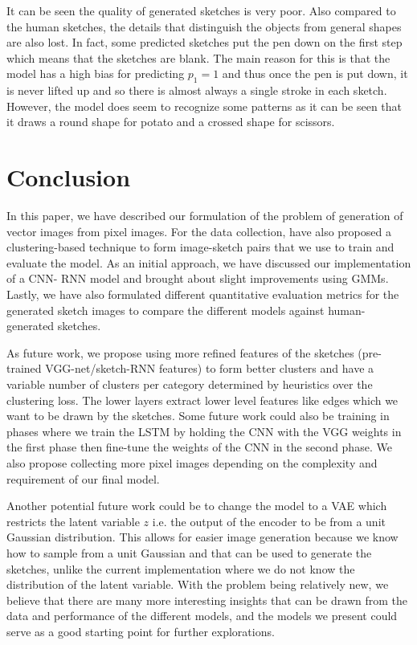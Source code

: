 \documentclass{article}
\begin{document}
It can be seen the quality of generated sketches is very poor. Also compared to the human sketches, the details that distinguish the objects from general shapes are also lost. In fact, some predicted sketches put the pen down on the first step which means that the sketches are blank. The main reason for this is that the model has a high bias for predicting $p_{1} = 1$ and thus once the pen is put down, it is never lifted up and so there is almost always a single stroke in each sketch. However, the model does seem to recognize some patterns as it can be seen that it draws a round shape for potato and a crossed shape for scissors.

\section{Conclusion}

In this paper, we have described our formulation of the problem of generation of vector images from pixel images. For the data collection, have also proposed a clustering-based technique to form image-sketch pairs that we use to train and evaluate the model. As an initial approach, we have discussed our implementation of a CNN- RNN model and brought about slight improvements using GMMs. Lastly, we have also formulated different quantitative evaluation metrics for the generated sketch images to compare the different models against human-generated sketches. 

As future work, we propose using more refined features of the sketches (pre-trained VGG-net/sketch-RNN features) to form better clusters and have a variable number of clusters per category determined by heuristics over the clustering loss. The lower layers extract lower level features like edges which we want to be drawn by the sketches. Some future work could also be training in phases where we train the LSTM by holding the CNN with the VGG weights in the first phase then fine-tune the weights of the CNN in the second phase. We also propose collecting more pixel images depending on the complexity and requirement of our final model.

Another potential future work could be to change the model to a VAE which restricts the latent variable $z$ i.e. the output of the encoder to be from a unit Gaussian distribution\cite{journals/corr/KingmaW13}. This allows for easier image generation because we know how to sample from a unit Gaussian and that can be used to generate the sketches, unlike the current implementation where we do not know the distribution of the latent variable. With the problem being relatively new, we believe that there are many more interesting insights that can be drawn from the data and performance of the different models, and the models we present could serve as a good starting point for further explorations.

{


}
\end{document}
